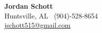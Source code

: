 {\LARGE \textbf{Jordan Schott}} \\[6pt]
{\small Huntsville, AL \textbar\ (904)-528-8654} \\
{\small \href{mailto:jschott515@gmail.com}{jschott515@gmail.com}}
